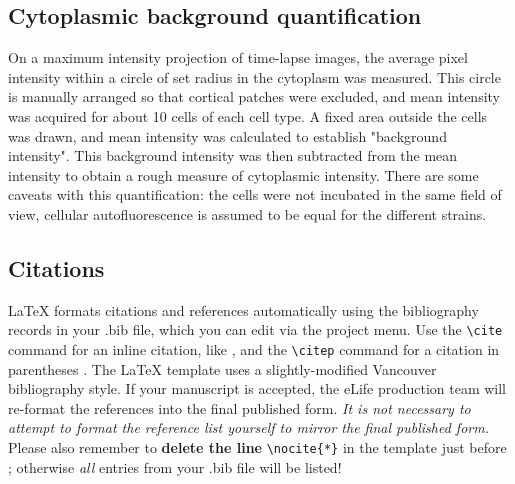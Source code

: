 \documentclass[9pt,lineno]{elife}
\begin{document}
\subsection{Cytoplasmic background quantification}
On a maximum intensity projection of time-lapse images, the average pixel intensity within a circle of set radius in the cytoplasm was measured. This circle is manually arranged so that cortical patches were excluded, and mean intensity was acquired for about 10 cells of each cell type. A fixed area outside the cells was drawn, and mean intensity was calculated to establish "background intensity". This background intensity was then subtracted from the mean intensity to obtain a rough measure of cytoplasmic intensity. There are some caveats with this quantification: the cells were not incubated in the same field of view, cellular autofluorescence is assumed to be equal for the different strains.

\subsection{Citations}

LaTeX formats citations and references automatically using the bibliography records in your .bib file, which you can edit via the project menu. Use the \verb|\cite| command for an inline citation, like \cite{Aivazian917}, and the \verb|\citep| command for a citation in parentheses \citep{Aivazian917}. The LaTeX template uses a slightly-modified Vancouver bibliography style. If your manuscript is accepted, the eLife production team will re-format the references into the final published form. \emph{It is not necessary to attempt to format the reference list yourself to mirror the final published form.} Please also remember to \textbf{delete the line} \verb|\nocite{*}| in the template just before \verb||; otherwise \emph{all} entries from your .bib file will be listed! 



\end{document}
